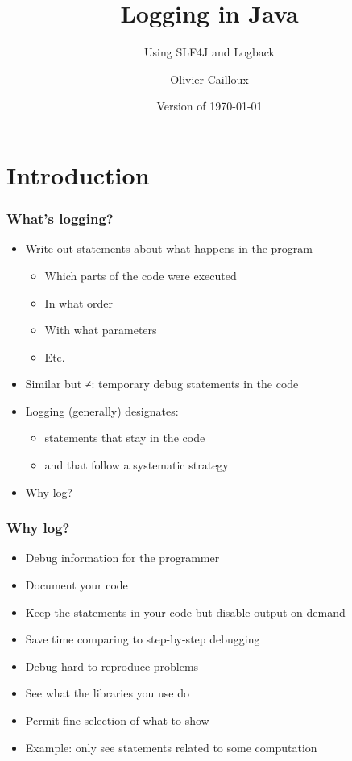 \documentclass[french, english]{beamer}
\title{Logging in Java}
\subtitle{Using SLF4J and Logback}
\author{Olivier Cailloux}
\institute[LAMSADE]{LAMSADE, Université Paris-Dauphine}
\date{Version of \today}
\begin{document}


\begin{frame}[plain]
   \titlepage
\end{frame}
\addtocounter{framenumber}{-1}

\section{Introduction}
\begin{frame}
	\frametitle{What’s logging?}
	\begin{itemize}
		\item Write out statements about what happens in the program
		\begin{itemize}
			\item Which parts of the code were executed
			\item In what order
			\item With what parameters
			\item Etc.
		\end{itemize}
		\item Similar but ≠: temporary debug statements in the code
		\item Logging (generally) designates: 
		\begin{itemize}
			\item statements that stay in the code
			\item and that follow a systematic strategy
		\end{itemize}
		\item Why log?
	\end{itemize}
\end{frame}

\begin{frame}
	\frametitle{Why log?}
	\begin{itemize}	
		\item Debug information for the programmer
		\item Document your code
		\item Keep the statements in your code but disable output on demand
		\item Save time comparing to step-by-step debugging
		\item Debug hard to reproduce problems
		\item See what the libraries you use do
		\item Permit fine selection of what to show
		\item Example: only see statements related to some computation
	\end{itemize}
\end{frame}
\end{document}
